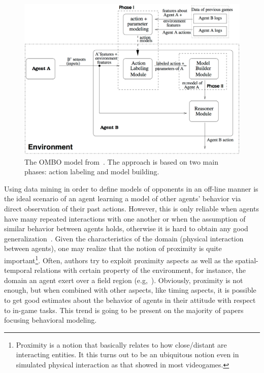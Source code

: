 \begin{figure}[htp]
  \centering  
  \includegraphics[draft=false, width=\textwidth]{images/04-competition/OMBO_model_task.png}
  \caption{The OMBO model from~\cite{ledezma_predicting_2005, ledezma_ombo:_2009}. The approach is based on two main phases: action labeling and model building.}
    \label{OMBO_model_task}
\end{figure}

Using data mining in order to define models of opponents in an off-line manner is the ideal scenario of an agent learning a model of other agents' behavior via direct observation of their past actions. However, this is only reliable when agents have many repeated interactions with one another or when the assumption of similar behavior between agents holds, otherwise it is hard to obtain any good generalization~\citep{stone_defining_2000}. Given the characteristics of the domain (physical interaction between agents), one may realize that the notion of proximity is quite important\footnote{Proximity is a notion that basically relates to how close/distant are interacting entities. It this turns out to be an ubiquitous notion even in simulated physical interaction as that showed in most videogames.}. Often, authors try to exploit proximity aspects as well as the spatial-temporal relations with certain property of the environment, for instance, the domain an agent exert over a field region (e.g,~\cite{riley_empirical_2002}). Obviously, proximity is not enough, but when combined with other aspects, like timing aspects, it is possible to get good estimates about the behavior of agents in their attitude with respect to in-game tasks. This trend is going to be present on the majority of papers focusing behavioral modeling.

